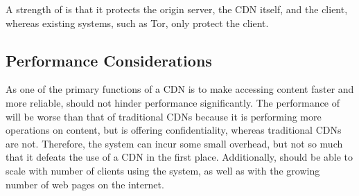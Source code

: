 


A strength of \system{} is that it protects the origin server, the CDN itself, and the client, whereas 
existing systems, such as Tor, only protect the client.

\subsection{Performance Considerations}
As one of the primary functions of a CDN is to make accessing content faster and more 
reliable, \system{} should not hinder performance significantly.  The performance of \system{} will 
be worse than that of traditional CDNs because it is performing more operations on content, but \system{} 
is offering confidentiality, whereas traditional CDNs are not. Therefore, the system can incur some small overhead, 
but not so much that it defeats the use of a CDN in the first place.  Additionally, \system{} should be able to 
scale with number of clients using the system, as well as with the growing number of web pages on the internet.
